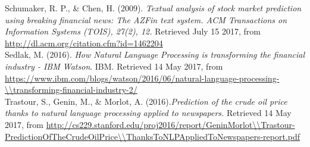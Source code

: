 \documentclass[11pt,a4paper]{article}
\begin{document}
Schumaker, R. P., \& Chen, H. (2009). \textit{Textual analysis of stock market prediction using breaking financial news: The AZFin text system. ACM Transactions on Information Systems (TOIS), 27(2), 12.} Retrieved July 15 2017, from \url{http://dl.acm.org/citation.cfm?id=1462204}\\


Sedlak, M. (2016). \textit{How Natural Language Processing is transforming the financial industry - IBM Watson}. IBM. Retrieved 14 May 2017, from \url{https://www.ibm.com/blogs/watson/2016/06/natural-language-processing-\\transforming-financial-industry-2/}\\

Trastour, S., Genin, M., \& Morlot, A. (2016).\textit{Prediction of the crude oil price thanks to natural language processing applied to newspapers.} Retrieved 14 May 2017, from \url{http://cs229.stanford.edu/proj2016/report/GeninMorlot\\Trastour-PredictionOfTheCrudeOilPrice\\ThanksToNLPAppliedToNewspapers-report.pdf}\\
\end{document}
